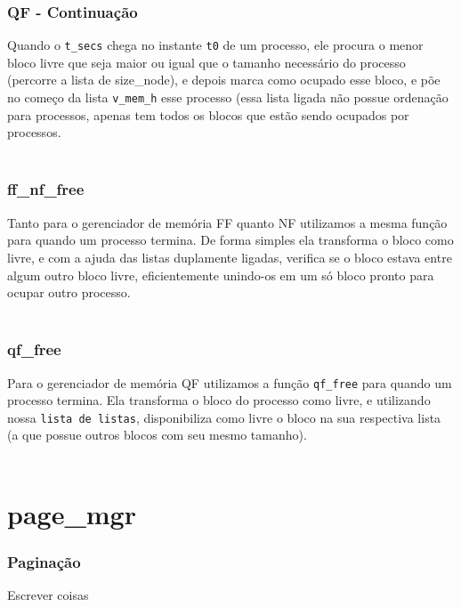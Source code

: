 \documentclass{beamer}
\begin{document}

\begin{frame}
  \frametitle{QF - Continuação}
  Quando o \texttt{t\_secs} chega no instante \texttt{t0} de um processo, ele procura o menor bloco livre que seja maior ou igual que o tamanho necessário do processo (percorre a lista de size\_node), e depois marca como ocupado esse bloco, e põe no começo da lista \texttt{v\_mem\_h} esse processo (essa lista ligada não possue ordenação para processos, apenas tem todos os blocos que estão sendo ocupados por processos.\\~\\

\end{frame}


\begin{frame}
  \frametitle{ff\_nf\_free}
  Tanto para o gerenciador de memória FF quanto NF utilizamos a mesma função para quando um processo termina. De forma simples ela transforma o bloco como livre, e com a ajuda das listas duplamente ligadas,
  verifica se o bloco estava entre algum outro bloco livre, eficientemente unindo-os em um só bloco pronto para ocupar outro processo.\\~\\

\end{frame}


\begin{frame}
  \frametitle{qf\_free}
  Para o gerenciador de memória QF utilizamos a função \texttt{qf\_free} para quando um processo termina. Ela transforma o bloco do processo como livre, e utilizando nossa \texttt{lista de listas}, disponibiliza como livre o bloco na sua respectiva lista (a que possue outros blocos com seu mesmo tamanho).\\~\\

\end{frame}

\section{page\_mgr}

\begin{frame}
\frametitle{Paginação}
Escrever coisas
\end{frame}
\end{document}
